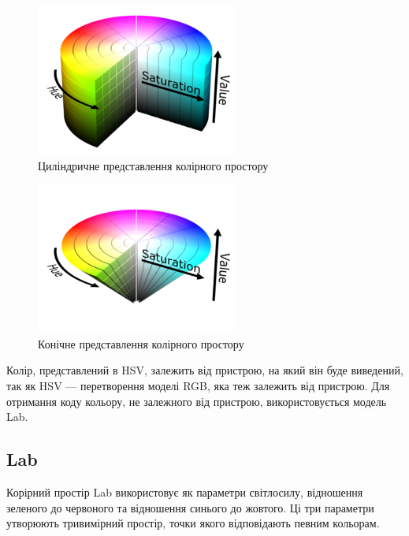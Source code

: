 \begin{figure}[H]
	\centering
	\includegraphics[width=0.7\linewidth]{theory/img/hsv_representation_cylindric}
	\caption{Циліндричне представлення колірного простору}
	\label{fig:hsv_representation_cylindric}
\end{figure}

\begin{figure}[H]
	\centering
	\includegraphics[width=0.7\linewidth]{theory/img/hsv_representation_cone}
	\caption{Конічне представлення колірного простору}
	\label{fig:hsv_representation_cone}
\end{figure}


Колір, представлений в HSV, залежить від пристрою, на який він буде виведений, так як HSV — перетворення моделі RGB, яка теж залежить від пристрою. Для отримання коду кольору, не залежного від пристрою, використовується модель Lab.

\subsection{Lab}

Корірний простір Lab використовує як параметри світлосилу, відношення зеленого до червоного та відношення синього до жовтого. Ці три параметри утворюють тривимірний простір, точки якого відповідають певним кольорам.

